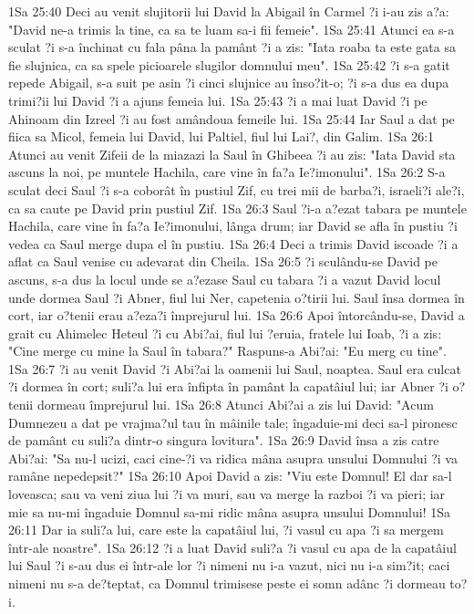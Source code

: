 1Sa 25:40  Deci au venit slujitorii lui David la Abigail în Carmel ?i i-au zis a?a: "David ne-a trimis la tine, ca sa te luam sa-i fii femeie".
1Sa 25:41  Atunci ea s-a sculat ?i s-a închinat cu fala pâna la pamânt ?i a zis: "Iata roaba ta este gata sa fie slujnica, ca sa spele picioarele slugilor domnului meu".
1Sa 25:42  ?i s-a gatit repede Abigail, s-a suit pe asin ?i cinci slujnice au înso?it-o; ?i s-a dus ea dupa trimi?ii lui David ?i a ajuns femeia lui.
1Sa 25:43  ?i a mai luat David ?i pe Ahinoam din Izreel ?i au fost amândoua femeile lui.
1Sa 25:44  Iar Saul a dat pe fiica sa Micol, femeia lui David, lui Paltiel, fiul lui Lai?, din Galim.
1Sa 26:1  Atunci au venit Zifeii de la miazazi la Saul în Ghibeea ?i au zis: "Iata David sta ascuns la noi, pe muntele Hachila, care vine în fa?a Ie?imonului".
1Sa 26:2  S-a sculat deci Saul ?i s-a coborât în pustiul Zif, cu trei mii de barba?i, israeli?i ale?i, ca sa caute pe David prin pustiul Zif.
1Sa 26:3  Saul ?i-a a?ezat tabara pe muntele Hachila, care vine în fa?a Ie?imonului, lânga drum; iar David se afla în pustiu ?i vedea ca Saul merge dupa el în pustiu.
1Sa 26:4  Deci a trimis David iscoade ?i a aflat ca Saul venise cu adevarat din Cheila.
1Sa 26:5  ?i sculându-se David pe ascuns, s-a dus la locul unde se a?ezase Saul cu tabara ?i a vazut David locul unde dormea Saul ?i Abner, fiul lui Ner, capetenia o?tirii lui. Saul însa dormea în cort, iar o?tenii erau a?eza?i împrejurul lui.
1Sa 26:6  Apoi întorcându-se, David a grait cu Ahimelec Heteul ?i cu Abi?ai, fiul lui ?eruia, fratele lui Ioab, ?i a zis: "Cine merge cu mine la Saul în tabara?" Raspuns-a Abi?ai: "Eu merg cu tine".
1Sa 26:7  ?i au venit David ?i Abi?ai la oamenii lui Saul, noaptea. Saul era culcat ?i dormea în cort; suli?a lui era înfipta în pamânt la capatâiul lui; iar Abner ?i o?tenii dormeau împrejurul lui.
1Sa 26:8  Atunci Abi?ai a zis lui David: "Acum Dumnezeu a dat pe vrajma?ul tau în mâinile tale; îngaduie-mi deci sa-l pironesc de pamânt cu suli?a dintr-o singura lovitura".
1Sa 26:9  David însa a zis catre Abi?ai: "Sa nu-l ucizi, caci cine-?i va ridica mâna asupra unsului Domnului ?i va ramâne nepedepsit?"
1Sa 26:10  Apoi David a zis: "Viu este Domnul! El dar sa-l loveasca; sau va veni ziua lui ?i va muri, sau va merge la razboi ?i va pieri; iar mie sa nu-mi îngaduie Domnul sa-mi ridic mâna asupra unsului Domnului!
1Sa 26:11  Dar ia suli?a lui, care este la capatâiul lui, ?i vasul cu apa ?i sa mergem într-ale noastre".
1Sa 26:12  ?i a luat David suli?a ?i vasul cu apa de la capatâiul lui Saul ?i s-au dus ei într-ale lor ?i nimeni nu i-a vazut, nici nu i-a sim?it; caci nimeni nu s-a de?teptat, ca Domnul trimisese peste ei somn adânc ?i dormeau to?i.
